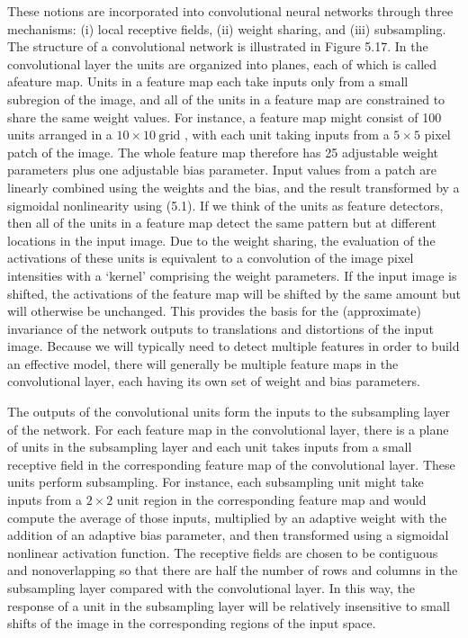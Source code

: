 \documentclass[
  10
]{article}
\begin{document}
These notions are incorporated into convolutional neural networks
through three mechanisms: (i) local receptive fields, (ii) weight
sharing, and (iii) subsampling. The structure of a convolutional network
is illustrated in Figure 5.17. In the convolutional layer the units are
organized into planes, each of which is called afeature map. Units in a
feature map each take inputs only from a small subregion of the image,
and all of the units in a feature map are constrained to share the same
weight values. For instance, a feature map might consist of 100 units
arranged in a \(1 0 \times 1 0 ~ \mathrm { g r i d }\) , with each unit
taking inputs from a \(5 \times 5\) pixel patch of the image. The whole
feature map therefore has 25 adjustable weight parameters plus one
adjustable bias parameter. Input values from a patch are linearly
combined using the weights and the bias, and the result transformed by a
sigmoidal nonlinearity using (5.1). If we think of the units as feature
detectors, then all of the units in a feature map detect the same
pattern but at different locations in the input image. Due to the weight
sharing, the evaluation of the activations of these units is equivalent
to a convolution of the image pixel intensities with a `kernel'
comprising the weight parameters. If the input image is shifted, the
activations of the feature map will be shifted by the same amount but
will otherwise be unchanged. This provides the basis for the
(approximate) invariance of the network outputs to translations and
distortions of the input image. Because we will typically need to detect
multiple features in order to build an effective model, there will
generally be multiple feature maps in the convolutional layer, each
having its own set of weight and bias parameters.

The outputs of the convolutional units form the inputs to the
subsampling layer of the network. For each feature map in the
convolutional layer, there is a plane of units in the subsampling layer
and each unit takes inputs from a small receptive field in the
corresponding feature map of the convolutional layer. These units
perform subsampling. For instance, each subsampling unit might take
inputs from a \(2 \times 2\) unit region in the corresponding feature
map and would compute the average of those inputs, multiplied by an
adaptive weight with the addition of an adaptive bias parameter, and
then transformed using a sigmoidal nonlinear activation function. The
receptive fields are chosen to be contiguous and nonoverlapping so that
there are half the number of rows and columns in the subsampling layer
compared with the convolutional layer. In this way, the response of a
unit in the subsampling layer will be relatively insensitive to small
shifts of the image in the corresponding regions of the input space.
\end{document}
